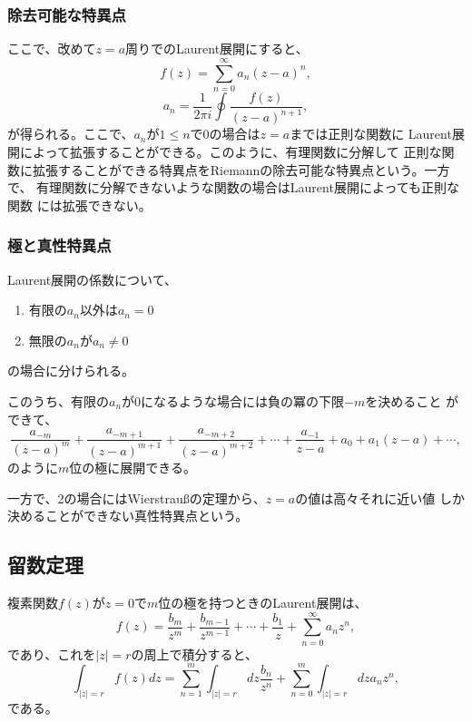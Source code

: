 \subsubsection{除去可能な特異点}
ここで、改めて$z=a$周りでのLaurent展開にすると、
\begin{equation}
 f(z) = \sum_{n=0}^{\infty}
  a_n (z-a)^n,
\end{equation}
\begin{equation}
 a_n = \frac{1}{2\pi i}\oint \frac{f(z)}{(z - a)^{n+1}},
\end{equation}
が得られる。ここで、$a_n$が$1\leq n$で0の場合は$z=a$までは正則な関数に
Laurent展開によって拡張することができる。このように、有理関数に分解して
正則な関数に拡張することができる特異点をRiemannの除去可能な特異点という。一方で、
有理関数に分解できないような関数の場合はLaurent展開によっても正則な関数
には拡張できない。

\subsubsection{極と真性特異点}
Laurent展開の係数について、
\begin{enumerate}
 \item 有限の$a_n$以外は$a_n=0$
 \item 無限の$a_n$が$a_n\ne 0$
\end{enumerate}
の場合に分けられる。

このうち、有限の$a_n$が0になるような場合には負の冪の下限$-m$を決めること
ができて、
\begin{equation}
 \frac{a_{-m}}{(z-a)^{m}}
  + \frac{a_{-m+1}}{(z-a)^{m+1}}
  + \frac{a_{-m+2}}{(z-a)^{m+2}}
  + \cdots 
  + \frac{a_{-1}}{z-a}
  + a_0
  + a_1 (z-a) + \cdots,
\end{equation}
のように$m$位の極に展開できる。

一方で、2の場合にはWierstrau\ss の定理から、$z=a$の値は高々それに近い値
しか決めることができない真性特異点という。

\subsection{留数定理}
複素関数$f(z)$が$z=0$で$m$位の極を持つときのLaurent展開は、
\begin{equation}
 f(z) = \frac{b_m}{z^m} + \frac{b_{m-1}}{z^{m-1}}
   + \cdots + \frac{b_1}{z} 
   + \sum_{n=0}^{\infty} a_n z^n,
\end{equation}
であり、これを$|z|=r$の周上で積分すると、
\begin{equation}
 \int_{|z|=r} f(z) dz 
  = \sum_{n=1}^{m} \int_{|z|=r}dz \frac{b_n}{z^n}
  + \sum_{n=0}^{m} \int_{|z|=r}dz a_nz^n,
\end{equation}
である。

